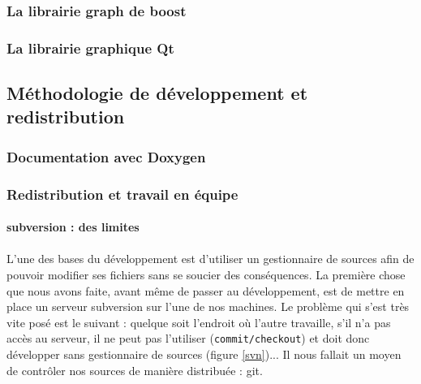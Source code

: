 \subsubsection{La librairie graph de boost}

\subsubsection{La librairie graphique Qt}


\subsection{Méthodologie de développement et redistribution}
\subsubsection{Documentation avec Doxygen}
\subsubsection{Redistribution et travail en équipe}
\paragraph{subversion : des limites}

\paragraph{} L'une des bases du développement est d'utiliser un gestionnaire de sources afin de pouvoir modifier ses fichiers sans se soucier des conséquences. La première chose que nous avons faite, avant même de passer au développement, est de mettre en place un serveur subversion sur l'une de nos machines. Le problème qui s'est très vite posé est le suivant : quelque soit l'endroit où l'autre travaille, s'il n'a pas accès au serveur, il ne peut pas l'utiliser (\verb|commit/checkout|) et doit donc développer sans gestionnaire de sources (figure \ref{svn})... Il nous fallait un moyen de contrôler nos sources de manière distribuée : git.

